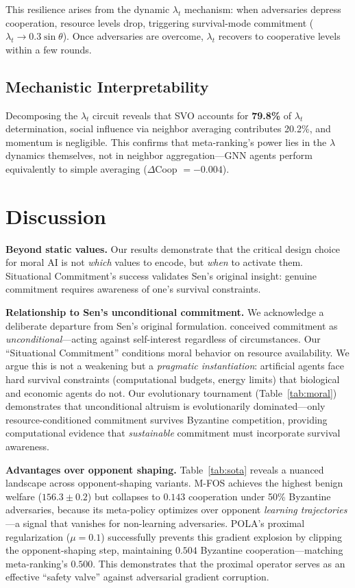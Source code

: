 \documentclass{article}
\begin{document}
This resilience arises from the dynamic $\lambda_t$ mechanism: when adversaries depress cooperation, resource levels drop, triggering survival-mode commitment ($\lambda_t \to 0.3\sin\theta$). Once adversaries are overcome, $\lambda_t$ recovers to cooperative levels within a few rounds.

\subsection{Mechanistic Interpretability}

Decomposing the $\lambda_t$ circuit reveals that SVO accounts for \textbf{79.8\%} of $\lambda_t$ determination, social influence via neighbor averaging contributes 20.2\%, and momentum is negligible. This confirms that meta-ranking's power lies in the $\lambda$ dynamics themselves, not in neighbor aggregation---GNN agents perform equivalently to simple averaging ($\Delta$Coop $= -0.004$).

\section{Discussion}

\textbf{Beyond static values.} Our results demonstrate that the critical design choice for moral AI is not \textit{which} values to encode, but \textit{when} to activate them. Situational Commitment's success validates Sen's original insight: genuine commitment requires awareness of one's survival constraints.

\textbf{Relationship to Sen's unconditional commitment.} We acknowledge a deliberate departure from Sen's original formulation. \citet{sen1977rational} conceived commitment as \textit{unconditional}---acting against self-interest regardless of circumstances. Our ``Situational Commitment'' conditions moral behavior on resource availability. We argue this is not a weakening but a \textit{pragmatic instantiation}: artificial agents face hard survival constraints (computational budgets, energy limits) that biological and economic agents do not. Our evolutionary tournament (Table~\ref{tab:moral}) demonstrates that unconditional altruism is evolutionarily dominated---only resource-conditioned commitment survives Byzantine competition, providing computational evidence that \textit{sustainable} commitment must incorporate survival awareness.

\textbf{Advantages over opponent shaping.} Table~\ref{tab:sota} reveals a nuanced landscape across opponent-shaping variants. M-FOS achieves the highest benign welfare ($156.3 {\pm} 0.2$) but collapses to $0.143$ cooperation under 50\% Byzantine adversaries, because its meta-policy optimizes over opponent \textit{learning trajectories}---a signal that vanishes for non-learning adversaries. POLA's proximal regularization ($\mu{=}0.1$) successfully prevents this gradient explosion by clipping the opponent-shaping step, maintaining $0.504$ Byzantine cooperation---matching meta-ranking's $0.500$. This demonstrates that the proximal operator serves as an effective ``safety valve'' against adversarial gradient corruption.
\end{document}
